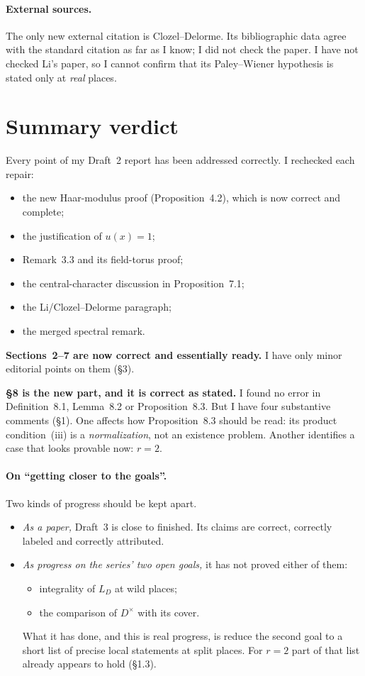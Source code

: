 \documentclass[11pt]{article}
\begin{document}
\paragraph{External sources.} The only new external citation is
Clozel--Delorme. Its bibliographic data agree with the standard
citation as far as I know; I did not check the paper. I have not checked
Li's paper, so I cannot confirm that its Paley--Wiener hypothesis is
stated only at \emph{real} places.

\section*{Summary verdict}
Every point of my Draft~2 report has been addressed correctly. I
rechecked each repair:
\begin{itemize}
\item the new Haar-modulus proof (Proposition~4.2), which is now correct
and complete;
\item the justification of $u(x)=1$;
\item Remark~3.3 and its field-torus proof;
\item the central-character discussion in Proposition~7.1;
\item the Li/Clozel--Delorme paragraph;
\item the merged spectral remark.
\end{itemize}

\textbf{Sections~2--7 are now correct and essentially ready.} I have only
minor editorial points on them (\S3).

\textbf{\S8 is the new part, and it is correct as stated.} I found no
error in Definition~8.1, Lemma~8.2 or Proposition~8.3. But I have four
substantive comments (\S1). One affects how Proposition~8.3 should be
read: its product condition~(iii) is a \emph{normalization}, not an
existence problem. Another identifies a case that looks provable now:
$r=2$.

\paragraph{On ``getting closer to the goals''.} Two kinds of progress
should be kept apart.
\begin{itemize}
\item \emph{As a paper,} Draft~3 is close to finished. Its claims are
correct, correctly labeled and correctly attributed.
\item \emph{As progress on the series' two open goals,} it has not
proved either of them:
\begin{itemize}
\item integrality of $L_D$ at wild places;
\item the comparison of $D^\times$ with its cover.
\end{itemize}
What it has done, and this is real progress, is reduce the second goal
to a short list of precise local statements at split places. For $r=2$
part of that list already appears to hold (\S1.3).
\end{itemize}
\end{document}
